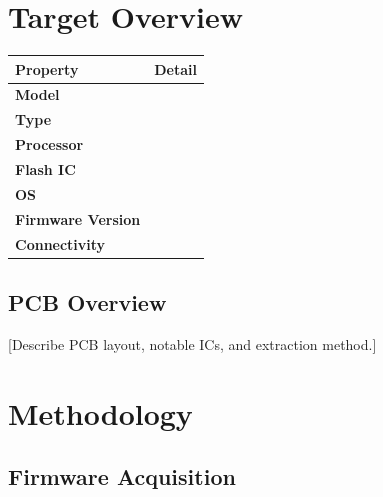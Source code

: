 \documentclass[12pt,a4paper]{article}
\begin{document}
\section{Target Overview}\label{sec:target-overview}

\begin{tabularx}{\linewidth}{lX}
  \toprule
  \rowcolor{tabhead}\textcolor{tabheadtext}{\textbf{Property}} &
  \textcolor{tabheadtext}{\textbf{Detail}} \\
  \midrule
  \textbf{Model}            & \\
  \rowcolor{rowalt}
  \textbf{Type}             & \\
  \textbf{Processor}        & \\
  \rowcolor{rowalt}
  \textbf{Flash IC}         & \\
  \textbf{OS}               & \\
  \rowcolor{rowalt}
  \textbf{Firmware Version} & \\
  \textbf{Connectivity}     & \\
  \bottomrule
\end{tabularx}

\vspace{1em}


\subsection{PCB Overview}

[Describe PCB layout, notable ICs, and extraction method.]

\section{Methodology}\label{sec:methodology}

\subsection{Firmware Acquisition}
\end{document}
